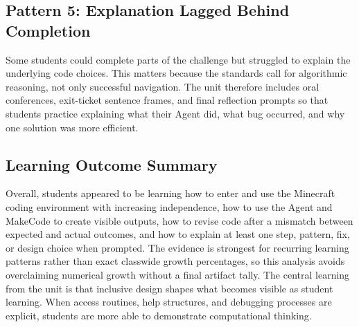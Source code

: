 \documentclass[12pt]{article}
\begin{document}
\subsection{Pattern 5: Explanation Lagged Behind Completion}
Some students could complete parts of the challenge but struggled to explain the underlying code choices. This matters because the standards call for algorithmic reasoning, not only successful navigation. The unit therefore includes oral conferences, exit-ticket sentence frames, and final reflection prompts so that students practice explaining what their Agent did, what bug occurred, and why one solution was more efficient.

\subsection{Learning Outcome Summary}
Overall, students appeared to be learning how to enter and use the Minecraft coding environment with increasing independence, how to use the Agent and MakeCode to create visible outputs, how to revise code after a mismatch between expected and actual outcomes, and how to explain at least one step, pattern, fix, or design choice when prompted. The evidence is strongest for recurring learning patterns rather than exact classwide growth percentages, so this analysis avoids overclaiming numerical growth without a final artifact tally. The central learning from the unit is that inclusive design shapes what becomes visible as student learning. When access routines, help structures, and debugging processes are explicit, students are more able to demonstrate computational thinking.
\end{document}
